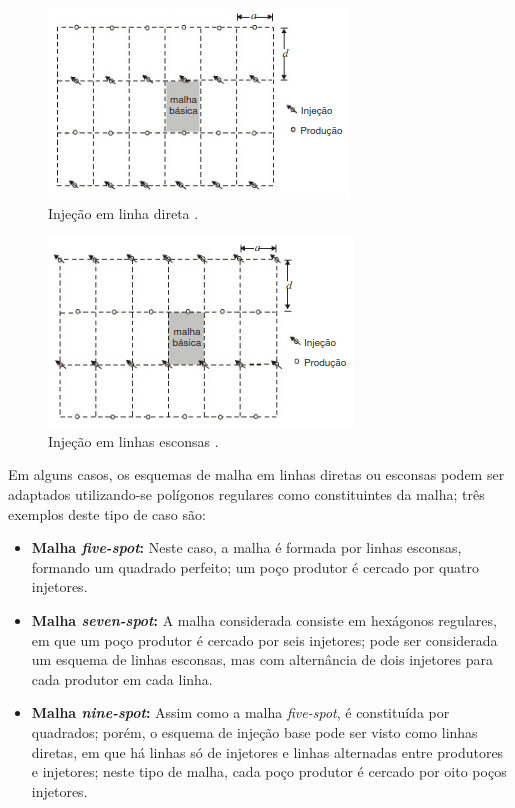 \begin{figure}[!ht]
\centering
\includegraphics[width=.6\textwidth]{figs/revisao/revisao_injld.png}
\caption{Inje\c{c}\~{a}o em linha direta \cite[p. 567]{engres}.}
\label{fig:rev_injld}
\end{figure}

\begin{figure}[!ht]
\centering
\includegraphics[width=.6\textwidth]{figs/revisao/revisao_injle.png}
\caption{Inje\c{c}\~{a}o em linhas esconsas \cite[p. 567]{engres}.}
\label{fig:rev_injle}
\end{figure}

Em alguns casos, os esquemas de malha em linhas diretas ou esconsas podem ser adaptados utilizando-se pol\'{i}gonos regulares como constituintes da malha; tr\^{e}s exemplos deste tipo de caso s\~{a}o:
\begin{itemize}
\item \textbf{Malha \textit{five-spot}:} Neste caso, a malha \'{e} formada por linhas esconsas, formando um quadrado perfeito; um po\c{c}o produtor \'{e} cercado por quatro injetores.
\item \textbf{Malha \textit{seven-spot}:} A malha considerada consiste em hex\'{a}gonos regulares, em que um po\c{c}o produtor \'{e} cercado por seis injetores; pode ser considerada um esquema de linhas esconsas, mas com altern\^{a}ncia de dois injetores para cada produtor em cada linha.
\item \textbf{Malha \textit{nine-spot}:} Assim como a malha \textit{five-spot}, \'{e} constitu\'{i}da por quadrados; por\'{e}m, o esquema de inje\c{c}\~{a}o base pode ser visto como linhas diretas, em que h\'{a} linhas s\'{o} de injetores e linhas alternadas entre produtores e injetores; neste tipo de malha, cada po\c{c}o produtor \'{e} cercado por oito po\c{c}os injetores.
\end{itemize}

